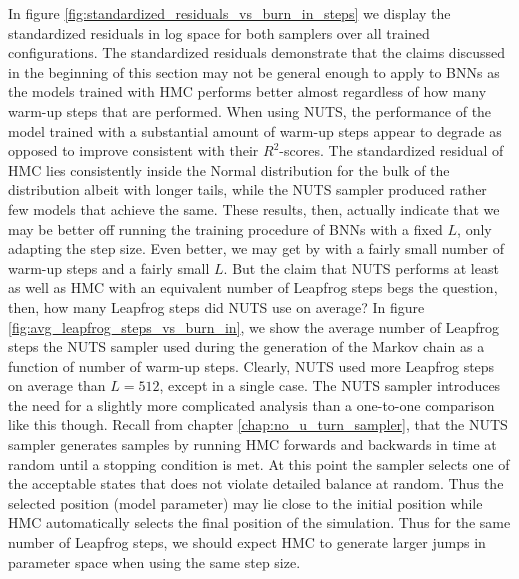 In figure \ref{fig:standardized_residuals_vs_burn_in_steps} we display the standardized residuals in log space for both samplers over all trained configurations. 
The standardized residuals demonstrate that the claims discussed in the beginning of this section may not be general enough to apply to BNNs as the models trained with HMC performs better almost regardless of how many warm-up steps that are performed. When using NUTS, the performance of the model trained with a substantial amount of warm-up steps appear to degrade as opposed to improve consistent with their $R^2$-scores. The standardized residual of HMC lies consistently inside the Normal distribution for the bulk of the distribution albeit with longer tails, while the NUTS sampler produced rather few models that achieve the same. These results, then, actually indicate that we may be better off running the training procedure of BNNs with a fixed $L$, only adapting the step size. Even better, we may get by with a fairly small number of warm-up steps and a fairly small $L$. But the claim that NUTS performs at least as well as HMC with an equivalent number of Leapfrog steps begs the question, then, how many Leapfrog steps did NUTS use on average? In figure \ref{fig:avg_leapfrog_steps_vs_burn_in}, we show the average number of Leapfrog steps the NUTS sampler used during the generation of the Markov chain as a function of number of warm-up steps. Clearly, NUTS used more Leapfrog steps on average than $L = 512$, except in a single case. The NUTS sampler introduces the need for a slightly more complicated analysis than a one-to-one comparison like this though. Recall from chapter \ref{chap:no_u_turn_sampler}, that the NUTS sampler generates samples by running HMC forwards and backwards in time at random until a stopping condition is met. At this point the sampler selects one of the acceptable states that does not violate detailed balance at random. Thus the selected position (model parameter) may lie close to the initial position while HMC automatically selects the final position of the simulation. Thus for the same number of Leapfrog steps, we should expect HMC to generate larger jumps in parameter space when using the same step size. 

